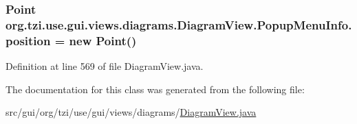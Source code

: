 \hypertarget{classorg_1_1tzi_1_1use_1_1gui_1_1views_1_1diagrams_1_1_diagram_view_1_1_popup_menu_info_aa81faab99f84257817e1964e5a0720c6}{
\subsubsection[{position}]{\setlength{\rightskip}{0pt plus 5cm}Point org.\-tzi.\-use.\-gui.\-views.\-diagrams.\-Diagram\-View.\-Popup\-Menu\-Info.\-position = new Point()}}\label{classorg_1_1tzi_1_1use_1_1gui_1_1views_1_1diagrams_1_1_diagram_view_1_1_popup_menu_info_aa81faab99f84257817e1964e5a0720c6}


Definition at line 569 of file Diagram\-View.\-java.



The documentation for this class was generated from the following file\-:\begin{DoxyCompactItemize}
\item 
src/gui/org/tzi/use/gui/views/diagrams/\hyperlink{_diagram_view_8java}{Diagram\-View.\-java}\end{DoxyCompactItemize}
